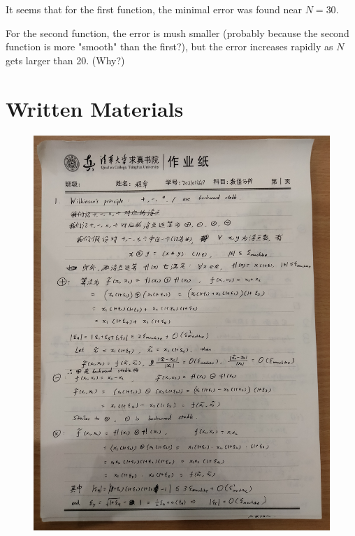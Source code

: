 \documentclass{article}
\begin{document}
It seems that for the first function, the minimal error was found near $N=30$.

For the second function, the error is mush smaller
(probably because the second function is more "smooth" than the first?), 
but the error increases rapidly as $N$ gets larger than 20. (Why?)

\section{Written Materials}

\begin{figure}[htbp]
	\centering
	\includegraphics[width=\textwidth]{hwna0201.jpg}
\end{figure}
\end{document}
